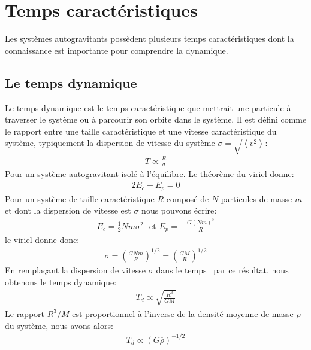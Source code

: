 \section{Temps caractéristiques\label{chap_trelax}}

Les systèmes autogravitants possèdent plusieurs temps caractéristiques dont la connaissance est importante pour comprendre la dynamique.

\subsection{Le temps dynamique}

Le temps dynamique est le temps caractéristique que mettrait une particule à traverser le système ou à parcourir son orbite dans le système. Il est
défini comme le rapport entre une taille caractéristique et une vitesse caractéristique du système, typiquement la dispersion de vitesse du système
$\sigma=\sqrt{\left\langle
v^2\right\rangle}$:
\begin{align}
	T\propto\frac{R}{\sigma} \label{Eq::TempsCarac::Tcr}
\end{align}
Pour un système autogravitant isolé à l'équilibre. Le théorème du viriel donne:
\begin{align*}
	2E_{c}+E_{p}=0
\end{align*}
Pour un système de taille caractéristique $R$ composé de $N$ particules de masse $m$ et dont la dispersion de vitesse est $\sigma$ nous pouvons écrire:
\begin{align*}
	E_{c}=\frac{1}{2}Nm\sigma^{2}\ \ \ \text{et\ \ \ }E_{p}=-\frac{G\left(Nm\right)^{2}}{R}%
\end{align*}
le viriel donne donc:
\begin{align*}
	\sigma=\left(  \frac{GNm}{R}\right)  ^{1/2}=\left(  \frac{GM}{R}\right) ^{1/2}%
\end{align*}
En remplaçant la dispersion de vitesse $\sigma$ dans le temps~ par ce résultat, nous obtenons le temps dynamique:
\begin{align*}
	T_{d}\propto\sqrt{\frac{R^{3}}{GM}}%
\end{align*}
Le rapport $R^{3}/M$ est proportionnel à l'inverse de la densité moyenne de masse $\overline{\rho}$ du système, nous avons alors:
\begin{align}
	T_{d}\propto\left(  G\overline{\rho}\right)  ^{-1/2} \label{def:T-dyn_tcr} %
\end{align}

